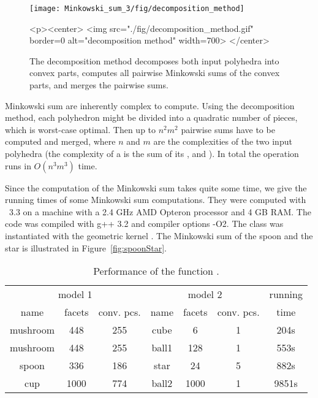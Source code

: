 \begin{figure}[t]
  \begin{ccTexOnly}
    \begin{center}
      \texttt{[image: Minkowski\_sum\_3/fig/decomposition\_method]}
    \end{center}
  \end{ccTexOnly}
  \begin{ccHtmlOnly}
    <p><center>
    <img src="./fig/decomposition_method.gif" border=0
    alt="decomposition method" width=700>
    </center>
  \end{ccHtmlOnly}
  \caption{The decomposition method decomposes both input polyhedra
           into convex parts, computes all pairwise Minkowski sums
           of the convex parts, and merges the pairwise sums.}
\end{figure}

Minkowski sum are inherently complex to compute. Using the
decomposition method, each polyhedron might be divided into a
quadratic number of pieces, which is worst-case optimal. Then up to
$n^2m^2$ pairwise sums have to be computed and merged, where $n$ and
$m$ are the complexities of the two input polyhedra (the complexity of
a  is the sum of its ,
 and ). In total the operation runs in
$O(n^3m^3)$ time.

Since the computation of the Minkowski sum takes quite some time, we
give the running times of some Minkowski sum computations. They were
computed with \cgal\ 3.3 on a machine with a 2.4 GHz AMD Opteron
processor and 4 GB RAM. The code was compiled with
g++ 3.2 and compiler options -O2. The
 class was instantiated with the geometric
kernel . The Minkowski sum of the spoon
and the star is illustrated in Figure~\ref{fig:spoonStar}.

\begin{table}[h]
\begin{center}
\begin{tabular}{|ccc|ccc|c|}
\hline
\multicolumn{3}{|c|}{model 1} & \multicolumn{3}{|c|}{model 2} & running \\
name & facets & conv. pcs. & name & facets & conv. pcs. & time \\ 
\hline
mushroom & 448 & 255 & cube & 6 & 1 & 204s \\
mushroom & 448 & 255 & ball1 & 128 & 1 & 553s \\
spoon & 336 & 186 & star & 24 & 5 & 882s \\
cup & 1000 & 774 & ball2 & 1000 & 1 & 9851s \\
\hline
\end{tabular}
\caption{Performance of the function .}
\end{center}
\end{table}

